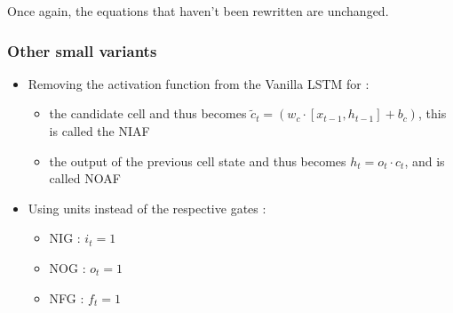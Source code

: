 Once again, the equations that haven't been rewritten are unchanged.

\subsubsection{Other small variants}

\begin{itemize}
  \item Removing the activation function from the Vanilla \ac{LSTM} for :
    \begin{itemize}
      \item the candidate cell and thus becomes $ \tilde{c}_t=(w_c\cdot[x_{t-1},h_{t-1}] + b_c) $, this is called the \ac{NIAF}
      \item the output of the previous cell state and thus becomes $ h_t=o_t\cdot c_t $, and is called \ac{NOAF}
    \end{itemize}
  \item Using units instead of the respective gates :
    \begin{itemize}
      \item \ac{NIG} : $i_t=1$
      \item \ac{NOG} : $o_t=1$
      \item \ac{NFG} : $f_t=1$
    \end{itemize}
\end{itemize}
